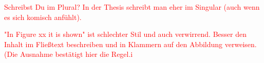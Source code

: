 \textcolor{red}{Schreibst Du im Plural? In der Thesis schreibt man eher im Singular (auch wenn es sich komisch anfühlt).}

\textcolor{red}{"In Figure xx it is shown" ist schlechter Stil und auch verwirrend. Besser den Inhalt im Fließtext beschreiben und in Klammern auf den Abbildung verweisen. (Die Ausnahme bestätigt hier die Regel.^^)}
